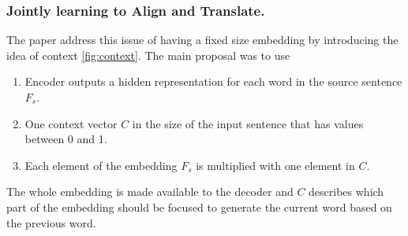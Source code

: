 \documentclass[conference]{IEEEtran}
\begin{document}
\subsubsection{Jointly learning to Align and Translate.}
The paper \cite{bahdanau2014neural} address this issue of having a fixed size embedding by introducing the idea of context \ref{fig:context}. The main proposal was to use
\begin{enumerate}
 \item Encoder outputs a hidden representation for each word in the source sentence $F_s$.
 \item One context vector $C$ in the size of the input sentence that has values between 0 and 1.
 \item Each element of the embedding $F_s$ is multiplied with one element in $C$.
\end{enumerate}
The whole embedding is made available to the decoder and $C$ describes which part of the embedding should be focused to generate the current word based on the previous word.

%  
% 
% 
% 
% 
% 
%  
% 
% 
\end{document}
